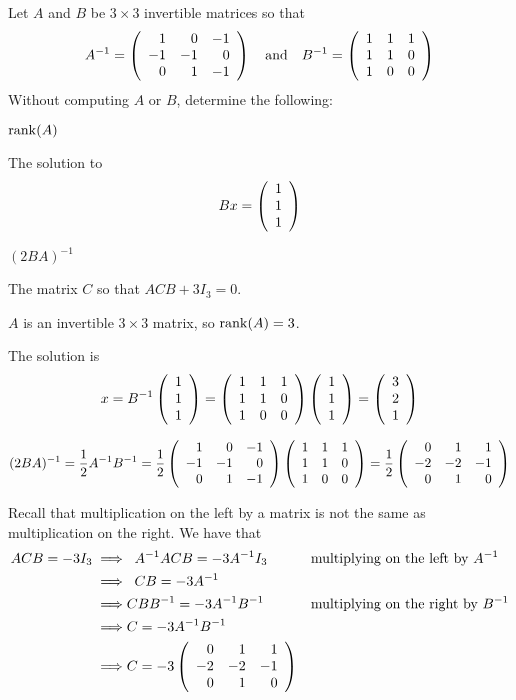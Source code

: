 \documentclass{ximera}
\begin{document}
\begin{exercise} \label{A3.7.1}
Let $A$ and $B$ be $3\times 3$ invertible matrices so that
\[
A^{-1} = \left(\begin{array}{rrrrrrrrrrrrrrrrrr} 1 & 0 & -1 \\ -1 & -1 &0 \\ 0 & 1 & -1 \end{array}\right)
\quad\text{and}\quad
B^{-1} = \left(\begin{array}{rrrrrrrrrrrrrrrrrr} 1 & 1 & 1 \\ 1 &1 &0 \\ 1 & 0 & 0 \end{array}\right)
\]
Without computing $A$ or $B$, determine the following:
\begin{enumeratea}
\item ${\rm rank}(A)$
\item The solution to 
\[
Bx=\left(\begin{array}{rrrrrrrrrrrrrrrrrr} 1 \\ 1 \\ 1 \end{array}\right)
\]
\item $(2BA)^{-1}$
\item The matrix $C$ so that $ACB+3I_3=0$.
\end{enumeratea} 



\begin{solution}
\begin{enumeratea}
\item $A$ is an invertible $3\times 3$ matrix, so ${\rm rank}(A)=3$.
\item The solution is 
\[
x = B^{-1}\left(\begin{array}{rrrrrrrrrrrrrrrrrr} 1 \\ 1 \\ 1 \end{array}\right)= \left(\begin{array}{rrrrrrrrrrrrrrrrrr} 1 & 1 & 1 \\ 1 &1 &0 \\ 1 & 0 & 0 \end{array}\right) \left(\begin{array}{rrrrrrrrrrrrrrrrrr} 1 \\ 1 \\ 1 \end{array}\right)=\left(\begin{array}{rrrrrrrrrrrrrrrrrr} 3 \\ 2 \\ 1 \end{array}\right)
\]
\item 
\[
(2BA)^{-1}=\frac{1}{2}A^{-1}B^{-1}=\frac{1}{2}
\left(\begin{array}{rrrrrrrrrrrrrrrrrr} 1 & 0 & -1 \\  -1 &-1 &0 \\  0 & 1 & -1 \end{array}\right)
\left(\begin{array}{rrrrrrrrrrrrrrrrrr} 1 & 1 & 1 \\  1 &1 &0 \\  1 & 0 & 0 \end{array}\right)
=\frac{1}{2}\left(\begin{array}{rrrrrrrrrrrrrrrrrr}  0 & 1 & 1 \\ -2 &-2 &-1 \\ 0 & 1 & 0 \end{array}\right)
\]
\item Recall that multiplication on the left by a matrix is not the same as multiplication on the right. We have that
\begin{align*}
ACB=-3I_3\implies&\;\;  A^{-1}ACB=-3A^{-1}I_3 &&\text{multiplying on the left by $A^{-1}$}\\
\implies & \;\; CB=-3A^{-1}\\
\implies & CBB^{-1}=-3A^{-1}B^{-1}&&\text{multiplying on the right by $B^{-1}$}\\
\implies & C=-3A^{-1}B^{-1}\\
\implies & C=-3\left(\begin{array}{rrrrrrrrrrrrrrrrrr}  0 & 1 & 1 \\ -2 &-2 &-1 \\ 0 & 1 & 0 \end{array}\right)
\end{align*}
\end{enumeratea}
\end{solution}
\end{exercise}
\end{document}
